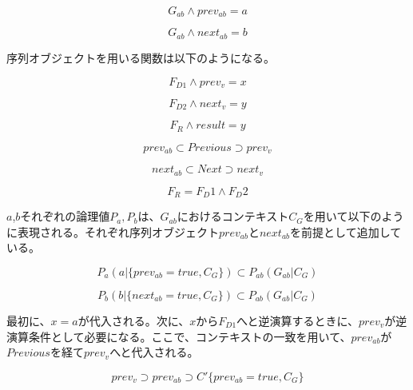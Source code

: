 \documentclass[12pt]{article}
\begin{document}
\begin{equation} G_{ab} \wedge prev_{ab} = a \end{equation}

\begin{equation} G_{ab} \wedge next_{ab} = b \end{equation}

序列オブジェクトを用いる関数は以下のようになる。

\begin{equation} F_{D1} \wedge prev_v = x \end{equation}

\begin{equation} F_{D2} \wedge next_v = y \end{equation}

\begin{equation} F_{R} \wedge result = y \end{equation}

\begin{equation}  prev_{ab} \subset Previous \supset prev_v \end{equation}

\begin{equation}  next_{ab} \subset Next \supset next_v \end{equation}

\begin{equation} F_R = F_D1 \wedge F_D2\end{equation}

\(a\),\(b\)それぞれの論理値\(P_a,P_b\)は、\(G_{ab}\)におけるコンテキスト\(C_G\)を用いて以下のように表現される。それぞれ序列オブジェクト\(prev_{ab}\)と\(next_{ab}\)を前提として追加している。

\begin{equation} P_a(a|\{prev_{ab}=true,C_G\}) \subset P_{ab}(G_{ab}|C_G) \end{equation}

\begin{equation} P_b(b|\{next_{ab}=true,C_G\})\subset P_{ab}(G_{ab}|C_G) \end{equation}

最初に、\(x=a\)が代入される。次に、\(x\)から\(F_{D1}\)へと逆演算するときに、\(prev_v\)が逆演算条件として必要になる。ここで、コンテキストの一致を用いて、\(prev_{ab}\)が\(Previous\)を経て\(prev_v\)へと代入される。

\begin{equation} prev_v \supset prev_{ab} \supset C'\{prev_{ab}=true,C_G\} \end{equation}
\end{document}
